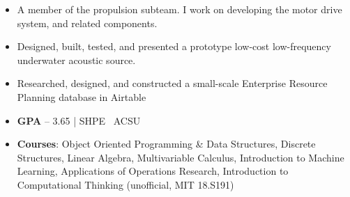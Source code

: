 \documentclass[10pt,a4paper,ragged2e]{altacv}
\begin{document}

\begin{itemize}
\item A member of the propulsion subteam. I work on developing the motor drive system, and related components.
\end{itemize}

\divider{}

\begin{itemize}
\item Designed, built, tested, and presented a prototype low-cost low-frequency underwater acoustic source.
\end{itemize}

\divider{}

\begin{itemize}
\item Researched, designed, and constructed a small-scale Enterprise Resource Planning database in Airtable
\end{itemize}

%



\begin{itemize}
\item \textbf{GPA} – 3.65 | SHPE \textbullet \, ACSU
\item \textbf{Courses}: Object Oriented Programming \& Data Structures, Discrete Structures, Linear Algebra, Multivariable Calculus, Introduction to Machine Learning, Applications of Operations Research, Introduction to Computational Thinking (unofficial, MIT 18.S191)
\end{itemize}

%
\end{document}

